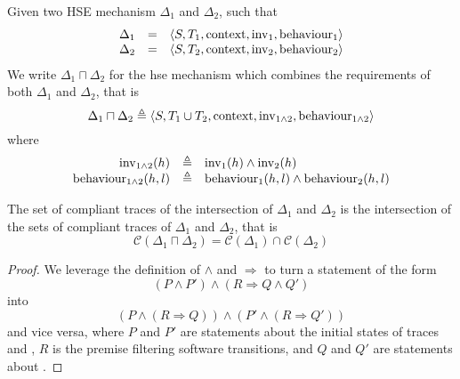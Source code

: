 \begin{definition}
  Given two HSE mechanism $\Delta_1$ and $\Delta_2$, such that
%
  \[
    \begin{array}{rcl}
      \Delta_1
      & =
      & \langle S, T_1, \mathrm{context}, \mathrm{inv}_1, \mathrm{behaviour}_1
        \rangle \\
      \Delta_2
      & =
      & \langle S, T_2, \mathrm{context}, \mathrm{inv}_2, \mathrm{behaviour}_2
        \rangle
    \end{array}
  \]
%
  We write $\Delta_1 \sqcap \Delta_2$ for the \ac{hse} mechanism which combines
  the requirements of both $\Delta_1$ and $\Delta_2$, that is
%
  \[
    \Delta_1 \sqcap \Delta_2 \triangleq \langle S, T_1 \cup T_2, \mathrm{context},
    \mathrm{inv}_{1\wedge2}, \mathrm{behaviour}_{1\wedge2} \rangle
  \]
%
  where
  \[
    \begin{array}{rcl}
      \mathrm{inv}_{1\wedge2}(h)
      & \triangleq
      & \mathrm{inv}_1(h) \wedge \mathrm{inv}_2(h) \\
      \mathrm{behaviour}_{1\wedge2}(h,l)
      & \triangleq
      & \mathrm{behaviour}_1(h,l) \wedge \mathrm{behaviour}_2(h,l)
    \end{array}
  \]
\end{definition}

\begin{lemma}
  \label{lemma:speccert:compinter}
  The set of compliant traces of the intersection of $\Delta_1$ and $\Delta_2$
  is the intersection of the sets of compliant traces of $\Delta_1$ and
  $\Delta_2$, that is
  \[
    \mathcal{C}(\Delta_1 \sqcap \Delta_2) = \mathcal{C}(\Delta_1) \cap
    \mathcal{C}(\Delta_2)
  \]

  \begin{proof}
    We leverage the definition of $\wedge$ and $\Rightarrow$ to turn a statement
    of the form
    \[
      (P \wedge P') \wedge (R \Rightarrow Q \wedge Q')
    \]
    into
    \[
      (P \wedge (R \Rightarrow Q)) \wedge (P' \wedge (R \Rightarrow Q'))
    \]
    and vice versa, where $P$ and $P'$ are statements about the initial states
    of traces and , $R$ is the premise filtering software transitions, and
    $Q$ and $Q'$ are statements about .
  \end{proof}
\end{lemma}

